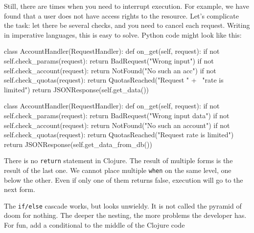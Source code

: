 
Still, there are times when you need to interrupt execution. For example, we have found that a user does not have access rights to the resource. Let's complicate the task: let there be several checks, and you need to cancel each request.
Writing in imperative languages, this is easy to solve. Python code might look like this:


\ifx\DEVICETYPE\MOBILE

\begin{python}
class AccountHandler(RequestHandler):
  def on_get(self, request):
    if not self.check_params(request):
      return BadRequest("Wrong input")
    if not self.check_account(request):
      return NotFound("No such an acc")
    if not self.check_quotas(request):
      return QuotasReached("Request " + \
             "rate is limited")
    return JSONResponse(self.get_data())
\end{python}

\else

\begin{python}
class AccountHandler(RequestHandler):
  def on_get(self, request):
    if not self.check_params(request):
      return BadRequest("Wrong input data")
    if not self.check_account(request):
      return NotFound("No such an account")
    if not self.check_quotas(request):
      return QuotasReached("Request rate is limited")
    return JSONResponse(self.get_data_from_db())
\end{python}

\fi

There is no \verb|return| statement in Clojure. The result of multiple forms is the result of the last one. We cannot place multiple \verb|when| on the same level, one below the other. Even if only one of them returns false, execution will go to the next form.


The \verb|if/else| cascade works, but looks unwieldy. It is not called the pyramid of doom for nothing. The deeper the nesting, the more problems the developer has. For fun, add a conditional to the middle of the Clojure code 

